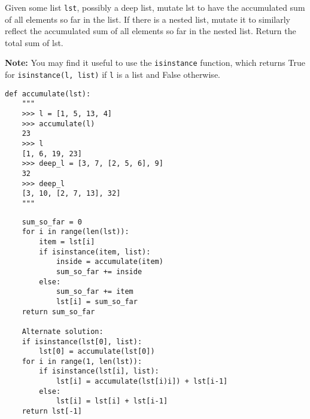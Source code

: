 \begin{blocksection}
\question Given some list \texttt{lst}, possibly a deep list, mutate lst to have
the accumulated sum of all elements so far in the list. If there is a nested
list, mutate it to similarly reflect the accumulated sum of all elements so far
in the nested list. Return the total sum of lst.

\textbf{Note:} You may find it useful to use the \texttt{isinstance} function,
which returns True for \texttt{isinstance(l, list)} if \texttt{l} is a list and
False otherwise.

\begin{lstlisting}
def accumulate(lst):
    """
    >>> l = [1, 5, 13, 4]
    >>> accumulate(l)
    23
    >>> l
    [1, 6, 19, 23]
    >>> deep_l = [3, 7, [2, 5, 6], 9]
    32
    >>> deep_l
    [3, 10, [2, 7, 13], 32]
    """
\end{lstlisting}
\begin{solution}[2.0in]
\begin{lstlisting}
    sum_so_far = 0
    for i in range(len(lst)):
        item = lst[i]
        if isinstance(item, list):
            inside = accumulate(item)
            sum_so_far += inside
        else:
            sum_so_far += item
            lst[i] = sum_so_far
    return sum_so_far

    Alternate solution:
    if isinstance(lst[0], list):
        lst[0] = accumulate(lst[0])
    for i in range(1, len(lst)):
        if isinstance(lst[i], list):
            lst[i] = accumulate(lst[i)i]) + lst[i-1]
        else:
            lst[i] = lst[i] + lst[i-1]
    return lst[-1]
\end{lstlisting}
\end{solution}
\end{blocksection}
